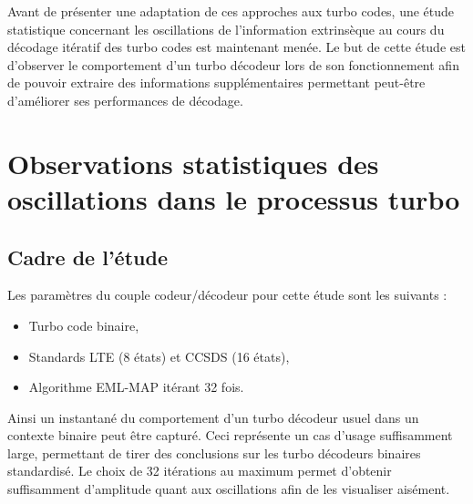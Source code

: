 Avant de présenter une adaptation de ces approches aux turbo codes, une étude statistique concernant les oscillations 
de l'information extrinsèque au cours du décodage itératif des turbo codes est maintenant menée.
Le but de cette étude est d'observer le comportement d'un turbo décodeur lors de son fonctionnement afin de pouvoir 
extraire des informations supplémentaires permettant peut-être d'améliorer ses performances de décodage.

\section{Observations statistiques des oscillations dans le processus turbo}\label{sec:observ}

\subsection{Cadre de l'étude}
Les paramètres du couple codeur/décodeur pour cette étude sont les suivants :
\begin{itemize}
	\item Turbo code binaire,
	\item Standards LTE (8 états) et CCSDS (16 états),
	\item Algorithme EML-MAP itérant 32 fois.\newline
\end{itemize}
Ainsi un instantané du comportement d'un turbo décodeur usuel dans un contexte binaire peut être capturé. Ceci représente 
un cas d'usage suffisamment large, permettant de tirer des conclusions sur les turbo décodeurs binaires standardisé.
Le choix de 32 
itérations au maximum permet d'obtenir suffisamment d'amplitude quant aux oscillations afin de les visualiser aisément. 

